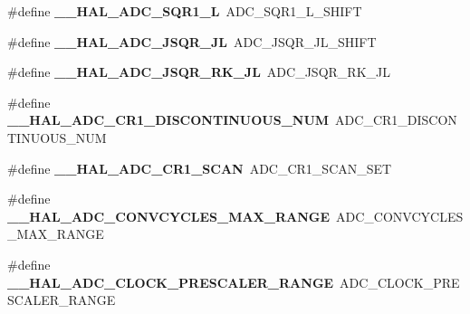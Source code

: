 \begin{DoxyCompactItemize}
\#define {\bfseries \+\_\+\+\_\+\+H\+A\+L\+\_\+\+A\+D\+C\+\_\+\+S\+Q\+R1\+\_\+L}~A\+D\+C\+\_\+\+S\+Q\+R1\+\_\+\+L\+\_\+\+S\+H\+I\+FT
\item 
\mbox{\label{group___h_a_l___a_d_c___aliased___macros_ga8764a28e2bb7d6a859fc52074e2ec1ec}} 
\#define {\bfseries \+\_\+\+\_\+\+H\+A\+L\+\_\+\+A\+D\+C\+\_\+\+J\+S\+Q\+R\+\_\+\+JL}~A\+D\+C\+\_\+\+J\+S\+Q\+R\+\_\+\+J\+L\+\_\+\+S\+H\+I\+FT
\item 
\mbox{\label{group___h_a_l___a_d_c___aliased___macros_ga51b8c1d68c48edfa958f988845d2ea41}} 
\#define {\bfseries \+\_\+\+\_\+\+H\+A\+L\+\_\+\+A\+D\+C\+\_\+\+J\+S\+Q\+R\+\_\+\+R\+K\+\_\+\+JL}~A\+D\+C\+\_\+\+J\+S\+Q\+R\+\_\+\+R\+K\+\_\+\+JL
\item 
\mbox{\label{group___h_a_l___a_d_c___aliased___macros_gab00342d0ece8deb8900df22b5193377e}} 
\#define {\bfseries \+\_\+\+\_\+\+H\+A\+L\+\_\+\+A\+D\+C\+\_\+\+C\+R1\+\_\+\+D\+I\+S\+C\+O\+N\+T\+I\+N\+U\+O\+U\+S\+\_\+\+N\+UM}~A\+D\+C\+\_\+\+C\+R1\+\_\+\+D\+I\+S\+C\+O\+N\+T\+I\+N\+U\+O\+U\+S\+\_\+\+N\+UM
\item 
\mbox{\label{group___h_a_l___a_d_c___aliased___macros_gae645d58040b162666fa506aeb3728f49}} 
\#define {\bfseries \+\_\+\+\_\+\+H\+A\+L\+\_\+\+A\+D\+C\+\_\+\+C\+R1\+\_\+\+S\+C\+AN}~A\+D\+C\+\_\+\+C\+R1\+\_\+\+S\+C\+A\+N\+\_\+\+S\+ET
\item 
\mbox{\label{group___h_a_l___a_d_c___aliased___macros_gaffcdf78845300c37812650611d2915b4}} 
\#define {\bfseries \+\_\+\+\_\+\+H\+A\+L\+\_\+\+A\+D\+C\+\_\+\+C\+O\+N\+V\+C\+Y\+C\+L\+E\+S\+\_\+\+M\+A\+X\+\_\+\+R\+A\+N\+GE}~A\+D\+C\+\_\+\+C\+O\+N\+V\+C\+Y\+C\+L\+E\+S\+\_\+\+M\+A\+X\+\_\+\+R\+A\+N\+GE
\item 
\mbox{\label{group___h_a_l___a_d_c___aliased___macros_gad371b9c9ce847537972a0bc6c1422c45}} 
\#define {\bfseries \+\_\+\+\_\+\+H\+A\+L\+\_\+\+A\+D\+C\+\_\+\+C\+L\+O\+C\+K\+\_\+\+P\+R\+E\+S\+C\+A\+L\+E\+R\+\_\+\+R\+A\+N\+GE}~A\+D\+C\+\_\+\+C\+L\+O\+C\+K\+\_\+\+P\+R\+E\+S\+C\+A\+L\+E\+R\+\_\+\+R\+A\+N\+GE
\item 

\end{DoxyCompactItemize}
